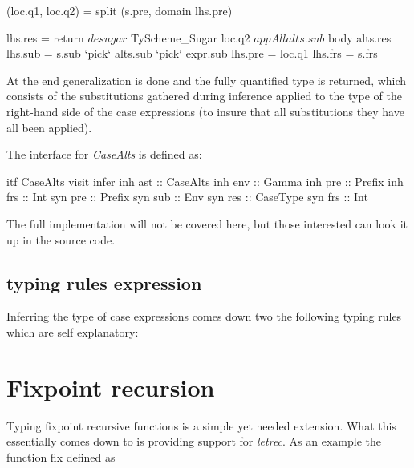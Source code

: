 \begin{code}       
   (loc.q1, loc.q2) = split (s.pre, domain lhs.pre)
   
   lhs.res = return $ desugar 
                    $ TyScheme_Sugar loc.q2 
                    $ appAll alts.sub 
                    $ body alts.res
   lhs.sub = s.sub `pick` alts.sub `pick` expr.sub
   lhs.pre = loc.q1
   lhs.frs = s.frs
\end{code}
At the end generalization is done and the fully quantified type is returned, which consists of the substitutions gathered during inference applied to the type of the right-hand side of the case expressions (to insure that all substitutions they have all been applied). 

The interface for \emph{CaseAlts} is defined as:
\begin{code}
itf CaseAlts
  visit infer
    inh ast :: CaseAlts
    inh env :: Gamma
    inh pre :: Prefix
    inh frs :: Int
    syn pre :: Prefix
    syn sub :: Env
    syn res :: CaseType
    syn frs :: Int 
\end{code}

The full implementation will not be covered here, but those interested can look it up in the source code.

\subsection{typing rules expression}
Inferring the type of case expressions comes down two the following typing rules which are self explanatory:

\begin{prooftree}
\end{prooftree}

\begin{prooftree}
\end{prooftree} 
\section{Fixpoint recursion}
Typing fixpoint recursive functions is a simple yet needed extension. What this essentially comes down to is providing support for \emph{letrec}. As an example the function fix defined as

